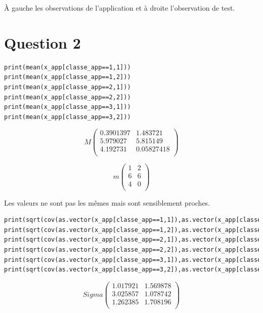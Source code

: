 \documentclass[a4paper,12pt]{report}
\begin{document}
À gauche les observations de l'application et à droite l'observation de test.
	
\section*{Question 2}

\begin{lstlisting}
print(mean(x_app[classe_app==1,1]))
print(mean(x_app[classe_app==1,2]))
print(mean(x_app[classe_app==2,1]))
print(mean(x_app[classe_app==2,2]))
print(mean(x_app[classe_app==3,1]))
print(mean(x_app[classe_app==3,2]))
\end{lstlisting}

\[M
   \left (
   \begin{array}{cc}
      0.3901397 & 1.483721 \\
      5.979027 & 5.815149 \\
      4.192731 & 0.05827418 \\
   \end{array}
   \right )
\]

\[m
   \left (
   \begin{array}{cc}
      1 & 2 \\
      6 & 6 \\
      4 & 0 \\
   \end{array}
   \right )
\]

Les valeurs ne sont pas les mêmes mais sont sensiblement proches.
\newpage 

\begin{lstlisting}
print(sqrt(cov(as.vector(x_app[classe_app==1,1]),as.vector(x_app[classe_app==1,1]))))
print(sqrt(cov(as.vector(x_app[classe_app==1,2]),as.vector(x_app[classe_app==1,2]))))
print(sqrt(cov(as.vector(x_app[classe_app==2,1]),as.vector(x_app[classe_app==2,1]))))
print(sqrt(cov(as.vector(x_app[classe_app==2,2]),as.vector(x_app[classe_app==2,2]))))
print(sqrt(cov(as.vector(x_app[classe_app==3,1]),as.vector(x_app[classe_app==3,1]))))
print(sqrt(cov(as.vector(x_app[classe_app==3,2]),as.vector(x_app[classe_app==3,2]))))
\end{lstlisting}

\[Sigma
   \left (
   \begin{array}{cc}
      1.017921 & 1.569878 \\
      3.025857 & 1.078742 \\
      1.262385 & 1.708196 \\
   \end{array}
   \right )
\]
\end{document}
